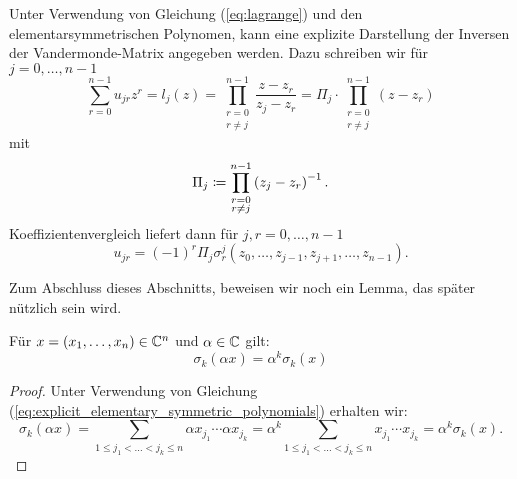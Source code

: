 \begin{remark}
    Unter Verwendung von Gleichung (\ref{eq:lagrange}) und den
    elementarsymmetrischen Polynomen, kann eine explizite Darstellung der
    Inversen der Vandermonde-Matrix angegeben werden.
    Dazu schreiben wir für $j = 0, \dots, n-1$
    \begin{equation*}
        \sum_{r = 0}^{n-1} u_{jr} z^{r}
        = l_j(z)
        = \prod_{\substack{r=0\\ r \neq j}}^{n-1} \frac{z - z_r}{z_j - z_r}
        = \Pi_j \cdot \prod_{\substack{r=0\\ r \neq j}}^{n-1} \left( z - z_r \right)
    \end{equation*}
    mit
    \begin{equation}
        \label{def:pi_j}
        \Pi_j \coloneqq \prod_{\substack{r=0\\ r \neq j}}^{n-1} \left( z_j - z_r \right)^{-1}.
    \end{equation}
    Koeffizientenvergleich liefert dann für $j, r = 0, \dots, n-1$
    \begin{equation}
        \label{eq:explicit_inverse_vandermonde}
        u_{jr} = (-1)^{r} \Pi_j \sigma_{r}^{j}(z_0, \dots, z_{j-1}, z_{j+1}, \dots, z_{n-1}).
    \end{equation}
\end{remark}

\noindent Zum Abschluss dieses Abschnitts, beweisen wir noch ein Lemma, das später
nützlich sein wird.

\begin{lemma}
    Für $x = (x_1, \dots, x_n) \in \mathbb{C}^n$ und $\alpha \in \mathbb{C}$ gilt:
    \begin{equation}
        \label{eq:elementary_symmetric_polynomials_const_multiplication}
        \sigma_{k}(\alpha x)
        = \alpha^{k} \sigma_{k}(x)
    \end{equation}
\end{lemma}

\begin{proof}
    Unter Verwendung von Gleichung
    (\ref{eq:explicit_elementary_symmetric_polynomials})
    erhalten wir:
    \[
        \sigma_{k}(\alpha x)
        = \sum_{1 \leq j_1 < \dots < j_k \leq n} \alpha x_{j_1} \cdots \alpha x_{j_k}
        = \alpha^k \sum_{1 \leq j_1 < \dots < j_k \leq n} x_{j_1} \cdots x_{j_k}
        = \alpha^k \sigma_{k}(x).
    \]
\end{proof}

